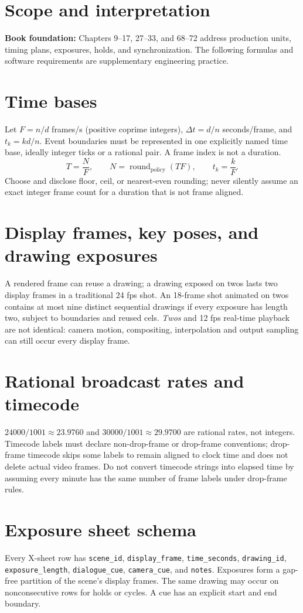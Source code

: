 \documentclass[10pt,letterpaper]{article}
\begin{document}
\makedoctitle
\makedocsummary
\tableofcontents\clearpage

\section{Scope and interpretation}
\textbf{Book foundation:} Chapters 9--17, 27--33, and 68--72 address production units, timing plans, exposures, holds, and synchronization. The following formulas and software requirements are supplementary engineering practice.
\section{Time bases}
Let $F=n/d$ frames/s (positive coprime integers), $\Delta t=d/n$ seconds/frame, and $t_k=kd/n$. Event boundaries must be represented in one explicitly named time base, ideally integer ticks or a rational pair. A frame index is not a duration.
\[T = \frac{N}{F},\qquad N=\operatorname{round}_{\mathrm{policy}}(TF),\qquad t_k=\frac{k}{F}.\]
Choose and disclose floor, ceil, or nearest-even rounding; never silently assume an exact integer frame count for a duration that is not frame aligned.
\section{Display frames, key poses, and drawing exposures}
A rendered frame can reuse a drawing; a drawing exposed on twos lasts two display frames in a traditional 24 fps shot. An 18-frame shot animated on twos contains at most nine distinct sequential drawings if every exposure has length two, subject to boundaries and reused cels. \emph{Twos} and 12 fps real-time playback are not identical: camera motion, compositing, interpolation and output sampling can still occur every display frame.
\section{Rational broadcast rates and timecode}
$24000/1001\approx 23.9760$ and $30000/1001\approx29.9700$ are rational rates, not integers. Timecode labels must declare non-drop-frame or drop-frame conventions; drop-frame timecode skips some labels to remain aligned to clock time and does not delete actual video frames. Do not convert timecode strings into elapsed time by assuming every minute has the same number of frame labels under drop-frame rules.
\section{Exposure sheet schema}
{\raggedright Every X-sheet row has \texttt{scene\_id}, \texttt{display\_frame}, \texttt{time\_seconds}, \texttt{drawing\_id}, \texttt{exposure\_length}, \texttt{dialogue\_cue}, \texttt{camera\_cue}, and \texttt{notes}. Exposures form a gap-free partition of the scene's display frames. The same drawing may occur on nonconsecutive rows for holds or cycles. A cue has an explicit start and end boundary.\par}
\end{document}
